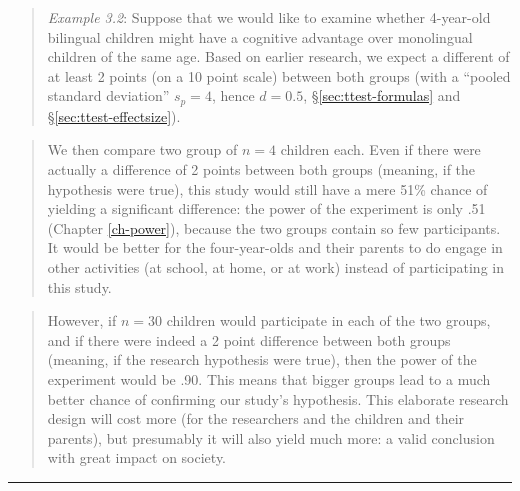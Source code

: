 \documentclass[
]{book}
\begin{document}
\begin{quote}
\emph{Example 3.2}: Suppose that we would like to examine whether 4-year-old bilingual children might have a cognitive advantage over monolingual children of the same age. Based on earlier research, we expect a different of at least 2 points (on a 10 point scale) between both groups (with a ``pooled standard deviation'' \(s_p=4\), hence \(d=0.5\), §\ref{sec:ttest-formulas} and §\ref{sec:ttest-effectsize}).
\end{quote}

\begin{quote}
We then compare two group of \(n = 4\) children each. Even if there were actually a difference of 2 points between both groups (meaning, if the hypothesis were true), this study would still have a mere 51\% chance of yielding a significant difference: the power of the experiment is only .51 (Chapter \ref{ch-power}), because the two groups contain so few participants. It would be better for the four-year-olds and their parents to do engage in other activities (at school, at home, or at work) instead of participating in this study.
\end{quote}

\begin{quote}
However, if \(n = 30\) children would participate in each of the two groups, and if there were indeed a 2 point difference between both groups (meaning, if the research hypothesis were true), then the power of the experiment would be .90. This means that bigger groups lead to a much better chance of confirming our study's hypothesis. This elaborate research design will cost more (for the researchers and the children and their parents), but presumably it will also yield much more: a valid conclusion with great impact on society.
\end{quote}

\begin{center}\rule{0.5\linewidth}{0.5pt}\end{center}
\end{document}
